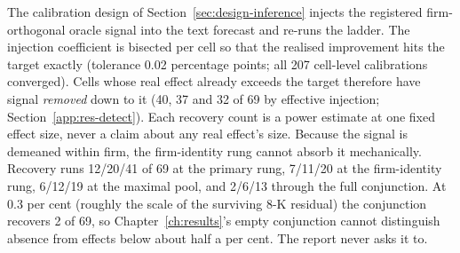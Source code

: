 The calibration design of Section~\ref{sec:design-inference} injects the registered firm-orthogonal oracle signal into the text forecast and re-runs the ladder. The injection coefficient is bisected per cell so that the realised improvement hits the target exactly (tolerance 0.02 percentage points; all 207 cell-level calibrations converged). Cells whose real effect already exceeds the target therefore have signal \emph{removed} down to it (40, 37 and 32 of 69 by effective injection; Section~\ref{app:res-detect}). Each recovery count is a power estimate at one fixed effect size, never a claim about any real effect's size. %
Because the signal is demeaned within firm, the firm-identity rung cannot absorb it mechanically. Recovery runs 12/20/41 of 69 at the primary rung, 7/11/20 at the firm-identity rung, 6/12/19 at the maximal pool, and 2/6/13 through the full conjunction. %
At 0.3 per cent (roughly the scale of the surviving 8-K residual) the conjunction recovers 2 of 69, so Chapter~\ref{ch:results}'s empty conjunction cannot distinguish absence from effects below about half a per cent. The report never asks it to. %

